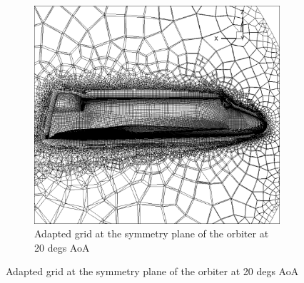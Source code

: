 \begin{figure}[H]
\begin{subfigure}[b]{0.65\textwidth}
		 \includegraphics[width=\textwidth]{report_images/20_adapted_grid.png}
		 \caption{Adapted grid at the symmetry plane of the orbiter at 20 degs AoA}
		 \label{fig: 20_adapt_grid}
    \end{subfigure}
\end{figure}

